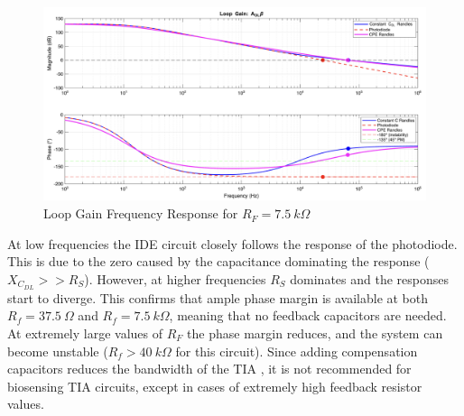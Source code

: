\begin{figure}[H]
    \centering
        \centering
        \includegraphics[width=\textwidth]{MatLabLG_7500.png}
    \caption{Loop Gain Frequency Response for $R_F=7.5~k\Omega$}
    \label{fig:matlab_lg}
\end{figure}
At low frequencies the IDE circuit closely follows the response of the photodiode. This is due to the zero caused by the capacitance dominating the response ($X_{C_{DL}}>>R_S$). However, at higher frequencies $R_S$ dominates and the responses start to diverge. This confirms that ample phase margin is available at both $R_f=37.5~\Omega$ and $R_f=7.5~k\Omega$, meaning that no feedback capacitors are needed. At extremely large values of $R_F$ the phase margin reduces, and the system can become unstable ($R_f>40~k\Omega$ for this circuit). Since adding compensation capacitors reduces the bandwidth of the TIA \cite{StabilizeYourTransimpedance}, it is not recommended for biosensing TIA circuits, except in cases of extremely high feedback resistor values.

